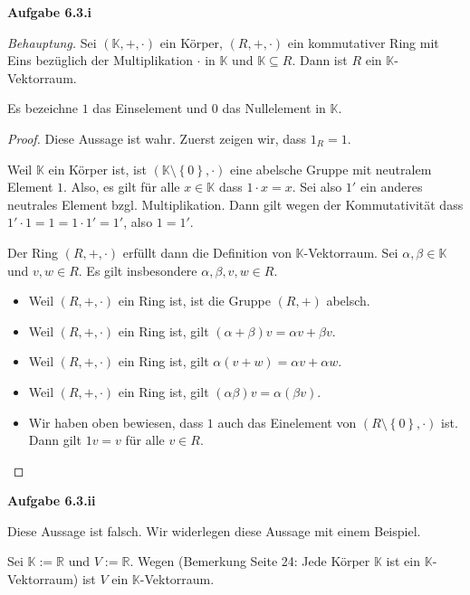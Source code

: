 \documentclass[12pt]{extarticle}
\newcommand{\ib}[1]{\boldsymbol{\mathit{#1}}}
\newcommand{\mg}[1]{\mathbb{#1}}
\begin{document}
\textbf{Aufgabe 6.3.i}

\textit{Behauptung.}  Sei \((\mg{K}, +, \cdot)\) ein Körper,
\((R, +, \cdot)\) ein kommutativer Ring mit Eins bezüglich der
Multiplikation \(\cdot\) in \(\mg{K}\) und \(\mg{K} \subseteq R\).  Dann
ist \(R\) ein \(\mg{K}\)-Vektorraum.

Es bezeichne \(1\) das Einselement und \(0\) das Nullelement in \(\mg{K}\).

\begin{proof}
  Diese Aussage ist wahr.  Zuerst zeigen wir, dass \(1_R = 1\).

  Weil \(\mg{K}\) ein Körper ist, ist $(\mg{K} \setminus \left\{
    0 \right\}, \cdot)$ eine abelsche Gruppe mit neutralem Element
  \(1\).  Also, es gilt für alle \(x \in \mg{K}\) dass \(1 \cdot x = x\).
  Sei also \(1'\) ein anderes neutrales Element bzgl. Multiplikation.
  Dann gilt wegen der Kommutativität dass $1' \cdot 1 = 1 = 1 \cdot 1'
  = 1'$, also \(1 = 1'\).

  Der Ring \((R, +, \cdot)\) erfüllt dann die Definition von
  \(\mg{K}\)-Vektorraum.  Sei \(\alpha, \beta \in \mg{K}\) und
  \(\ib{v}, \ib{w} \in R\).  Es gilt insbesondere
  \(\alpha, \beta, \ib{v}, \ib{w} \in R\).
  \begin{itemize}
  \item Weil \((R, +, \cdot)\) ein Ring ist, ist die Gruppe \((R, +)\)
    abelsch.
  \item Weil \((R, +, \cdot)\) ein Ring ist, gilt
    \((\alpha+\beta)\ib{v}=\alpha\ib{v}+\beta\ib{v}\).
  \item Weil \((R, +, \cdot)\) ein Ring ist, gilt
    \(\alpha(\ib{v}+\ib{w})=\alpha\ib{v}+\alpha\ib{w}\).
  \item Weil \((R, +, \cdot)\) ein Ring ist, gilt
    \((\alpha\beta)\ib{v}=\alpha(\beta\ib{v})\).
  \item Wir haben oben bewiesen, dass \(1\) auch das Einelement von $(R
    \setminus \left\{ 0 \right\}, \cdot)$ ist.  Dann gilt
    \(1\ib{v}=\ib{v}\) für alle \(\ib{v} \in R\).
  \end{itemize}
\end{proof}

\textbf{Aufgabe 6.3.ii}

Diese Aussage ist falsch.  Wir widerlegen diese Aussage mit einem
Beispiel.

Sei \(\mg{K}:=\mg{R}\) und \(V:=\mg{R}\). Wegen (Bemerkung Seite 24: Jede
Körper \(\mg{K}\) ist ein \(\mg{K}\)-Vektorraum) ist \(V\) ein \(\mg{K}\)-Vektorraum.
\end{document}
